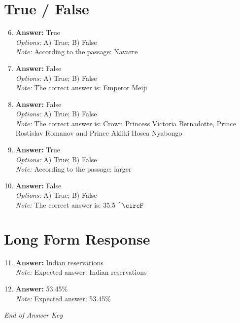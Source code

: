 \documentclass[12pt]{article}
\begin{document}
\section*{True / False}
\begin{enumerate}[label=\arabic*.]
\setcounter{enumi}{5}
\item \textbf{Answer:} True
\\ \textit{Options:} A) True; B) False
\\ \textit{Note:} According to the passage: Navarre
\item \textbf{Answer:} False
\\ \textit{Options:} A) True; B) False
\\ \textit{Note:} The correct answer is: Emperor Meiji
\item \textbf{Answer:} False
\\ \textit{Options:} A) True; B) False
\\ \textit{Note:} The correct answer is: Crown Princess Victoria Bernadotte, Prince Rostislav Romanov and Prince Akiiki Hosea Nyabongo
\item \textbf{Answer:} True
\\ \textit{Options:} A) True; B) False
\\ \textit{Note:} According to the passage: larger
\item \textbf{Answer:} False
\\ \textit{Options:} A) True; B) False
\\ \textit{Note:} The correct answer is: 35.5 ^\ensuremath{\circF}
\end{enumerate}

\section*{Long Form Response}
\begin{enumerate}[label=\arabic*.]
\setcounter{enumi}{10}
\item \textbf{Answer:} Indian reservations
\\ \textit{Note:} Expected answer: Indian reservations
\item \textbf{Answer:} 53.45\%
\\ \textit{Note:} Expected answer: 53.45\%
\end{enumerate}

\vfill
\noindent\textit{End of Answer Key}
\end{document}
